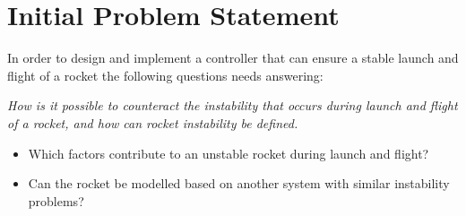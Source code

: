 \chapter{Initial Problem Statement}
In order to design and implement a controller that can ensure a stable launch and flight of a rocket the following questions needs answering: 

\textit{How is it possible to counteract the instability that occurs during launch and flight of a rocket, and how can rocket instability be defined.}
\bigbreak
\begin{itemize}[noitemsep]
\item Which factors contribute to an unstable rocket during launch and flight?
\item Can the rocket be modelled based on another system with similar instability problems?
\end{itemize}


